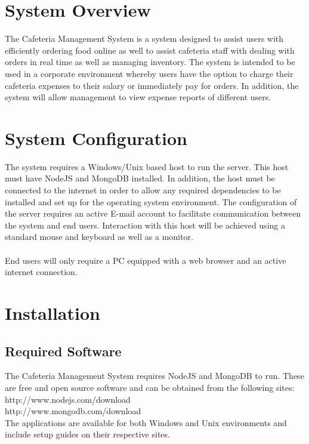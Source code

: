 \documentclass[12pt]{article}
\begin{document}
\maketitle
\break

\tableofcontents
\break

\section{System Overview}
The Cafeteria Management System is a system designed to assist users with efficiently ordering food online as well to assist cafeteria staff with dealing with orders in real time as well as managing inventory. The system is intended to be used in a corporate environment whereby users have the option to charge their cafeteria expenses to their salary or immediately pay for orders. In addition, the system will allow management to view expense reports of different users.

\section{System Configuration}
The system requires a Windows/Unix based host to run the server. This host must have NodeJS and MongoDB installed. In addition, the host must be connected to the internet in order to allow any required dependencies to be installed and set up for the operating system environment. The configuration of the server requires an active E-mail account to facilitate communication between the system and end users. Interaction with this host will be achieved using a standard mouse and keyboard as well as a monitor.\\
\\
End users will only require a PC equipped with a web browser and an active internet connection.

\section{Installation}
\subsection{Required Software}
The Cafeteria Management System requires NodeJS and MongoDB to run. These are free and open source software and can be obtained from the following sites:\\
http://www.nodejs.com/download \\
http://www.mongodb.com/download \\
The applications are available for both Windows and Unix environments and include setup guides on their respective sites.
\end{document}

